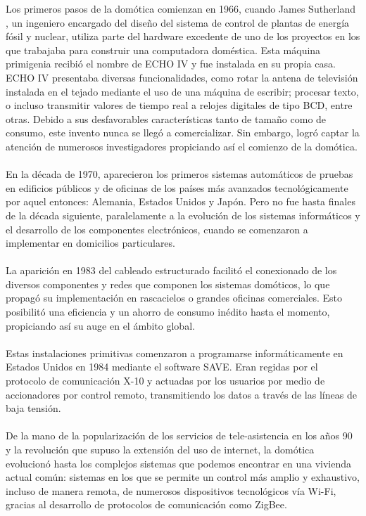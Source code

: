 Los primeros pasos de la domótica comienzan en 1966, cuando James Sutherland \cite{Cortesi:2015}, un ingeniero encargado del diseño del sistema de control de plantas de energía fósil y nuclear, utiliza parte del hardware excedente de uno de los proyectos en los que trabajaba para construir una computadora doméstica. Esta máquina primigenia recibió el nombre de ECHO IV \cite{CHM:2016} y fue instalada en su propia casa. ECHO IV presentaba diversas funcionalidades, como rotar la antena de televisión instalada en el tejado mediante el uso de una máquina de escribir; procesar texto, o incluso transmitir valores de tiempo real a relojes digitales de tipo BCD, entre otras. Debido a sus desfavorables características tanto de tamaño como de consumo, este invento nunca se llegó a comercializar. Sin embargo, logró captar la atención de numerosos investigadores propiciando así el comienzo de la domótica.\\\\
En la década de 1970, aparecieron los primeros sistemas automáticos de pruebas en edificios públicos y de oficinas de los países más avanzados tecnológicamente por aquel entonces: Alemania, Estados Unidos y Japón. Pero no fue hasta finales de la década siguiente, paralelamente a la evolución de los sistemas informáticos y el desarrollo de los componentes electrónicos, cuando se comenzaron a implementar en domicilios particulares. \\\\
La aparición en 1983 del cableado estructurado facilitó el conexionado de los diversos componentes y redes que componen los sistemas domóticos, lo que propagó su implementación en rascacielos o grandes oficinas comerciales. Esto posibilitó una eficiencia y un ahorro de consumo inédito hasta el momento, propiciando así su auge en el ámbito global. \\\\
Estas instalaciones primitivas comenzaron a programarse informáticamente en Estados Unidos en 1984 mediante el software SAVE. Eran regidas por el protocolo de comunicación X-10 y actuadas por los usuarios por medio de accionadores por control remoto, transmitiendo los datos a través de las líneas de baja tensión. \\\\
De la mano de la popularización de los servicios de tele-asistencia en los años 90 y la revolución que supuso la extensión del uso de internet, la domótica evolucionó hasta los complejos sistemas que podemos encontrar en una vivienda actual común: sistemas en los que se permite un control más amplio y exhaustivo, incluso de manera remota, de numerosos dispositivos tecnológicos vía Wi-Fi, gracias al desarrollo de protocolos de comunicación como ZigBee. \\\\
